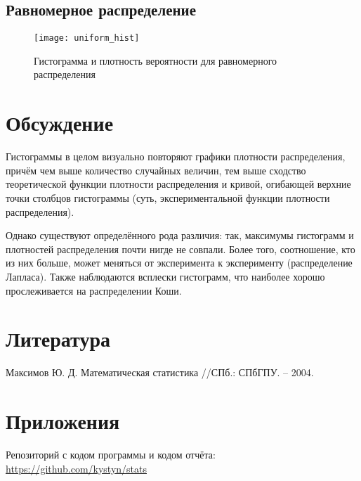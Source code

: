 \subsection{Равномерное распределение}
\begin{figure}[H]
	\begin{center}
		\texttt{[image: uniform\_hist]}
		\caption{Гистограмма и плотность вероятности для равномерного распределения} 
		\label{pic:pic_name}
	\end{center}
\end{figure}


\section{Обсуждение}
Гистограммы в целом визуально повторяют графики плотности распределения, причём чем выше количество случайных величин, тем выше сходство теоретической функции плотности распределения и кривой, огибающей верхние точки столбцов гистограммы (суть, экспериментальной функции плотности распределения).

Однако существуют определённого рода различия: так, максимумы гистограмм и плотностей распределения почти нигде не совпали. Более того, соотношение, кто из них больше, может меняться от эксперимента к эксперименту (распределение Лапласа). Также наблюдаются всплески гистограмм, что наиболее хорошо прослеживается на распределении Коши.



\section{Литература}
Максимов Ю. Д. Математическая статистика //СПб.: СПбГПУ. – 2004.

\section{Приложения}

Репозиторий с кодом программы и кодом отчёта: \href{https://github.com/kystyn/stats}{https://github.com/kystyn/stats}



